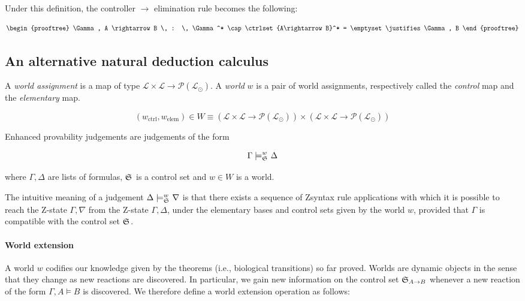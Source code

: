 Under this definition, the controller $\rightarrow$ elimination rule becomes the
following:

\[
  \begin{prooftree}
    \Gamma, A \rightarrow B \, : \, \Gamma^* \cap \ctrlset{A\rightarrow B}^* =
    \emptyset
    \justifies
    \Gamma, B
  \end{prooftree}
\]

\subsection{An alternative natural deduction calculus}

\begin{definition}[World]
  A \emph{world assignment} is a map of type
  $\mathcal{L} \times \mathcal{L} \to \mathcal{P}(\mathcal{L}_\odot)$.  A
  \emph{world} $w$ is a pair of world assignments, respectively called the
  \emph{control} map and the \emph{elementary} map.

  \[
    (w_{\text{ctrl}}, w_{\text{elem}}) \in W \equiv
    (\mathcal{L} \times \mathcal{L} \to \mathcal{P}(\mathcal{L}_\odot))
    \times (\mathcal{L} \times \mathcal{L} \to \mathcal{P}(\mathcal{L}_\odot))
  \]
\end{definition}

\begin{definition}
  Enhanced provability judgements are judgements of the form

  \[
    \Gamma \models_{\mathfrak{S}_{}}^w \Delta
  \]

  where $\Gamma, \Delta$ are lists of formulas, $\mathfrak{S}_{}$ is a control set
  and $w \in W$ is a world.
\end{definition}

The intuitive meaning of a judgement $\Delta \models_{\mathfrak{S}_{}}^w \nabla$ is
that there exists a sequence of Zsyntax rule applications with which it is
possible to reach the Z-state $\Gamma, \nabla$ from the Z-state
$\Gamma, \Delta$, under the elementary bases and control sets given by the world
$w$, provided that $\Gamma$ is compatible with the control set $\mathfrak{S}_{}$.

\paragraph{World extension}

A world $w$ codifies our knowledge given by the theorems (i.e., biological
transitions) so far proved. Worlds are dynamic objects in the sense that they
change as new reactions are discovered. In particular, we gain new information
on the control set $\mathfrak{S}_{A \rightarrow B}$ whenever a new reaction of the
form $\Gamma, A \models B$ is discovered. We therefore define a world extension
operation as follows:

